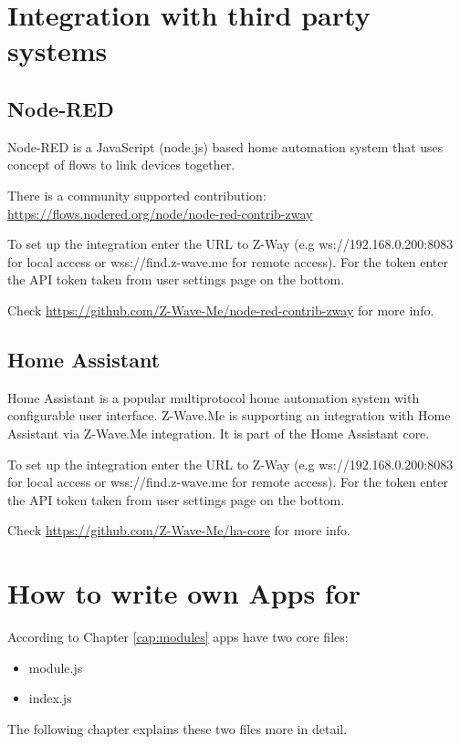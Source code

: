 \section{Integration with third party systems}
\label{integratingzway}

\subsection{Node-RED}
Node-RED is a JavaScript (node.js) based home automation system that uses
concept of flows to link devices together.

There is a community supported contribution:
\url{https://flows.nodered.org/node/node-red-contrib-zway}

To set up the integration enter the URL to Z-Way (e.g ws://192.168.0.200:8083
for local access or wss://find.z-wave.me for remote access). For the token
enter the API token taken from user settings page on the bottom.

Check \url{https://github.com/Z-Wave-Me/node-red-contrib-zway} for more
info.

\subsection{Home Assistant}
Home Assistant is a popular multiprotocol home automation system with
configurable user interface. Z-Wave.Me is supporting an integration with
Home Assistant via Z-Wave.Me integration. It is part of the Home Assistant
core.

To set up the integration enter the URL to Z-Way (e.g ws://192.168.0.200:8083
for local access or wss://find.z-wave.me for remote access). For the token
enter the API token taken from user settings page on the bottom.

Check \url{https://github.com/Z-Wave-Me/ha-core} for more info.


\section{How to write own Apps for \zway}
\label{developownapps}

According to Chapter \ref{cap:modules} apps have two core files:

\begin{itemize}
\item module.js
\item index.js
\end{itemize}

The following chapter explains these two files more in detail. 

